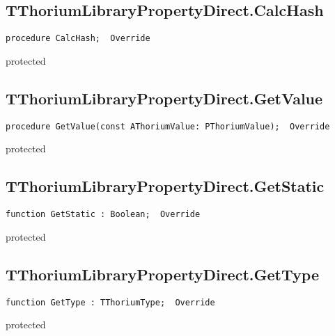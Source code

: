 \subsection{TThoriumLibraryPropertyDirect.CalcHash}
\label{thoriumcorepkg:thorium:tthoriumlibrarypropertydirect:calchash}
\begin{FPCList}
\Declaration 

\begin{verbatim}
procedure CalcHash;  Override
\end{verbatim}
\Visibility
protected
\end{FPCList}
\subsection{TThoriumLibraryPropertyDirect.GetValue}
\label{thoriumcorepkg:thorium:tthoriumlibrarypropertydirect:getvalue}
\begin{FPCList}
\Declaration 

\begin{verbatim}
procedure GetValue(const AThoriumValue: PThoriumValue);  Override
\end{verbatim}
\Visibility
protected
\end{FPCList}
\subsection{TThoriumLibraryPropertyDirect.GetStatic}
\label{thoriumcorepkg:thorium:tthoriumlibrarypropertydirect:getstatic}
\begin{FPCList}
\Declaration 

\begin{verbatim}
function GetStatic : Boolean;  Override
\end{verbatim}
\Visibility
protected
\end{FPCList}
\subsection{TThoriumLibraryPropertyDirect.GetType}
\label{thoriumcorepkg:thorium:tthoriumlibrarypropertydirect:gettype}
\begin{FPCList}
\Declaration 

\begin{verbatim}
function GetType : TThoriumType;  Override
\end{verbatim}
\Visibility
protected
\end{FPCList}
